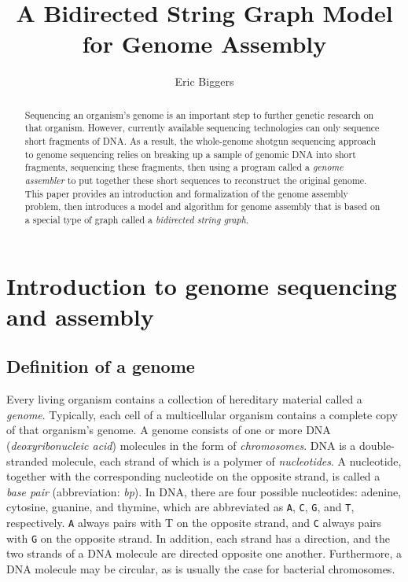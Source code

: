 \documentclass[10pt]{article}
\title{A Bidirected String Graph Model for Genome Assembly}
\author{Eric Biggers}
\newcommand\Base[1]{{\tt #1}}
\newcommand{\KeyTerm}[1]{{\it #1}}
\begin{document}
\maketitle

\begin{abstract}

Sequencing an organism's genome is an important step to further genetic research
on that organism.  However, currently available sequencing technologies can only
sequence short fragments of DNA.  As a result, the whole-genome shotgun
sequencing approach to genome sequencing relies on breaking up a sample of
genomic DNA into short fragments, sequencing these fragments, then using a
program called a {\em genome assembler} to put together these short sequences to
reconstruct the original genome.  This paper provides an introduction and
formalization of the genome assembly problem, then introduces a model and
algorithm for genome assembly that is based on a special type of graph called a
\KeyTerm{bidirected string graph}.  \end{abstract}

\tableofcontents

\section{Introduction to genome sequencing and assembly}

\subsection{Definition of a genome}

\label{sec:genome}

Every living organism contains a collection of hereditary material called a
\KeyTerm{genome}.  Typically, each cell of a multicellular organism contains a
complete copy of that organism's genome.  A genome consists of one or more DNA
(\KeyTerm{deoxyribonucleic acid}) molecules in the form of
\KeyTerm{chromosomes}.  DNA is a double-stranded molecule, each strand of which
is a polymer of \KeyTerm{nucleotides}.  A nucleotide, together with the
corresponding nucleotide on the opposite strand, is called a \KeyTerm{base pair}
(abbreviation: \KeyTerm{bp}).  In DNA, there are four possible nucleotides:
adenine, cytosine, guanine, and thymine, which are abbreviated as \Base{A},
\Base{C}, \Base{G}, and \Base{T}, respectively.  \Base{A} always pairs with T on
the opposite strand, and \Base{C} always pairs with \Base{G} on the opposite strand.
In addition, each strand has a direction, and the two strands of a DNA molecule
are directed opposite one another.  Furthermore, a DNA molecule may be circular,
as is usually the case for bacterial chromosomes.
\end{document}
